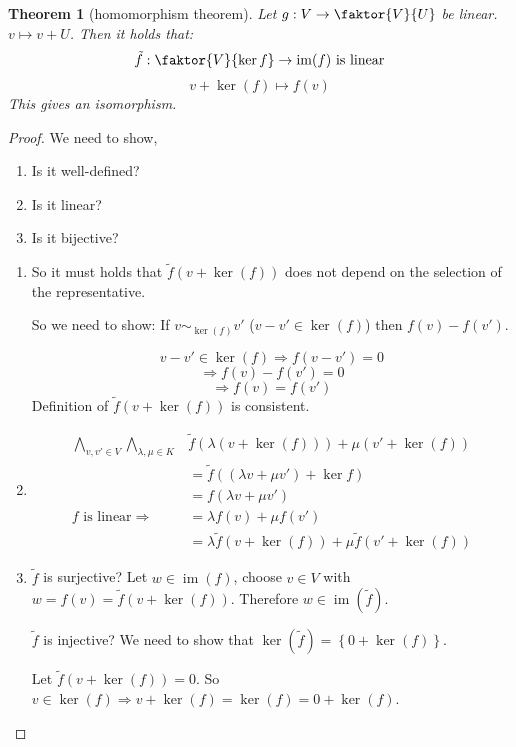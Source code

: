\documentclass[a4paper,landscape,twocolumn]{article}
\newcommand\set[1]{\left\{#1\right\}}
\newtheorem{theorem}{Theorem}
\DeclareMathOperator\image{im} %
\DeclareMathOperator\kernel{ker} %
\begin{document}
\begin{theorem}[homomorphism theorem] %
  \label{satz-5-21}
  Let $g: V \rightarrow \faktor{V}{U}$ be linear. $v \mapsto v + U$.
  Then it holds that:
  \[ \tilde{f}: \faktor{V}{\kernel{f}} \rightarrow \image(f) \text{ is linear} \]
  \[ v + \kernel(f) \mapsto f(v) \]
  This gives an isomorphism.
\end{theorem}
\begin{proof}
  We need to show,
  \begin{enumerate}
    \item Is it well-defined?
    \item Is it linear?
    \item Is it bijective?
  \end{enumerate}

  \begin{enumerate}
    \item
      So it must holds that $\tilde{f}(v + \kernel(f))$ does not depend on the selection of the representative.

      So we need to show:
      If $v \sim_{\kernel(f)} v'$ ($v - v' \in \kernel(f)$) then $f(v) - f(v')$.

      \[ v - v' \in \kernel(f) \Rightarrow f(v - v') = 0 \]
      \[ \Rightarrow f(v) - f(v') = 0 \]
      \[ \Rightarrow f(v) = f(v') \]
      Definition of $\tilde{f}(v + \kernel(f))$ is consistent.
    \item
      \begin{align*}
        \bigwedge_{v,v' \in V} \bigwedge_{\lambda,\mu \in K} &
        \tilde{f}(\lambda(v + \kernel(f))) + \mu(v' + \kernel(f)) \\
        &= \tilde{f}((\lambda v + \mu v') + \kernel{f}) \\
        &= f(\lambda v + \mu v') \\
      \text{$f$ is linear} \Rightarrow
        &= \lambda f(v) + \mu f(v') \\
        &= \lambda \tilde{f}(v + \kernel(f)) + \mu \tilde{f}(v' + \kernel(f))
      \end{align*}
    \item
      $\tilde{f}$ is surjective?
      Let $w \in \image(f)$, choose $v \in V$ with $w = f(v) = \tilde{f}(v + \kernel(f))$.
      Therefore $w \in \image(\tilde{f})$.

      $\tilde{f}$ is injective?
      We need to show that $\kernel(\tilde{f}) = \set{0 + \kernel(f)}$.

      Let $\tilde{f}(v + \kernel(f)) = 0$.
      So $v \in \kernel(f) \Rightarrow v + \kernel(f) = \kernel(f) = 0 + \kernel(f)$.
  \end{enumerate}
\end{proof}
\end{document}
